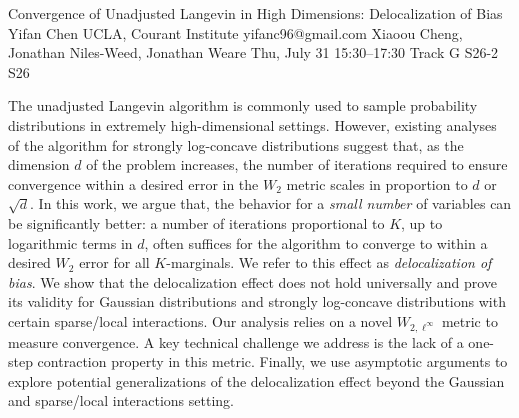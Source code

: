 \begin{talk}
  {Convergence of Unadjusted Langevin in High Dimensions: Delocalization of Bias}%
  {Yifan Chen}%
  {UCLA, Courant Institute}%
  {yifanc96@gmail.com}%
  {Xiaoou Cheng, Jonathan Niles-Weed, Jonathan Weare}%
  {}%
  {Thu, July 31 15:30–17:30 Track G}%
  {S26-2}%
  {S26}%
  
				
			
The unadjusted Langevin algorithm is commonly used to sample probability distributions in extremely high-dimensional settings. However, existing analyses of the algorithm for strongly log-concave distributions suggest that, as the dimension $d$ of the problem increases, the number of iterations required to ensure convergence within a desired error in the $W_2$ metric scales in proportion to $d$ or $\sqrt{d}$. In this work, we argue that, the behavior for a \emph{small number} of variables can be significantly better: a number of iterations proportional to $K$, up to logarithmic terms in $d$,
often suffices for the algorithm to converge to within a desired $W_2$ error for all $K$-marginals.
We refer to this effect as 
\textit{delocalization of bias}. 
We show that the delocalization effect does not hold universally and prove its validity for Gaussian distributions and strongly log-concave distributions with certain sparse/local interactions. Our analysis relies on a novel $W_{2,\ell^\infty}$ metric to measure convergence. A key technical challenge we address is the lack of a one-step contraction property in this metric. Finally, we use asymptotic arguments to explore potential generalizations of the delocalization effect beyond the Gaussian and sparse/local interactions setting.

\end{talk}

